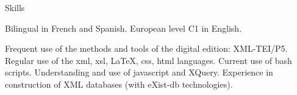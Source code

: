 











\begin{rubric}{Skills}
                    \entry*
                    
                Bilingual in French and Spanish. European level C1 in English.
                    \entry*
                    
                Frequent use of the methods and tools of the digital edition: XML-TEI/P5.
                    Regular use of the xml, xsl, LaTeX, css, html languages. Current use of bash
                    scripts. Understanding and use of javascript and XQuery. Experience in
                    construction of XML databases (with eXist-db technologies).\end{rubric}



